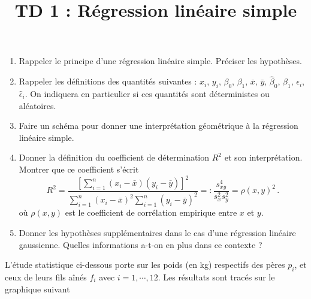 \documentclass{../headers/td_upc}
\title{TD 1 : Régression linéaire simple}
\providecommand{\1}{\mathds{1}}
\begin{document}
	\maketitle
	
	
	\begin{enumerate}
		\item Rappeler le principe d'une régression linéaire simple. Préciser les hypothèses.
		\item Rappeler les définitions des quantités suivantes :
		$x_i$, $y_i$, $\beta_0$, $\beta_1$, $\bar x$, $\bar y$, $\hat \beta_0$, $\hat \beta_1$, $\epsilon_i$, $\hat \epsilon_i$.
		On indiquera en particulier si ces quantités sont déterministes ou aléatoires.
		\item Faire un schéma pour donner une interprétation géométrique à la régression linéaire simple.
		\item Donner la définition du coefficient de détermination $R^2$ et son interprétation. Montrer que ce coefficient s'écrit
		\[
		R^2 = \dfrac{[\sum_{i=1}^n (x_i - \bar x)(y_i - \bar y)]^2}{\sum_{i=1}^n (x_i - \bar x)^2 \sum_{i=1}^n(y_i - \bar y)^2} =: \dfrac{s_{x y}^4}{s_{x}^2 s_{y}^2} = \rho(x, y)^2\,.
		\]
		où $\rho(x,y)$ est le coefficient de corrélation empirique entre $x$ et $y$.
		\item Donner les hypothèses supplémentaires dans le cas d'une régression linéaire gaussienne.
		Quelles informations a-t-on en plus dans ce contexte ?
	\end{enumerate}
	
	\cor{\newpage}
	
	\exo{}
	L'étude statistique ci-dessous porte sur les poids (en kg) respectifs des pères $p_{i}$,
	et ceux de leurs fils aînés $f_{i}$ avec $i=1,\cdots,12$.
	Les résultats sont tracés sur le graphique suivant
	
\end{document}
